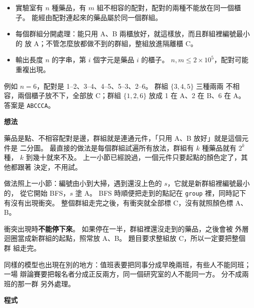 \begin{itemize}
\item 實驗室有 $n$ 種藥品，有 $m$ 組不相容的配對，配對的兩種不能放在同一個櫃
子。 能經由配對連起來的藥品屬於同一個群組。
\item 每個群組分開處理：能只用 A、B 兩櫃放好，就這樣放，而且群組裡編號最小的
放 A；不管怎麼放都做不到的群組，整組放進隔離櫃 C。
\item 輸出長度 $n$ 的字串，第 $i$ 個字元是藥品 $i$ 的櫃子。 $n, m \le 2 \times
10^5$，配對可能重複出現。
\end{itemize}

例如 $n = 6$，配對是 1--2、3--4、4--5、5--3、2--6。 群組 $\{3, 4, 5\}$ 三種兩兩
不相容，兩個櫃子放不下，全部放 C；群組 $\{1, 2, 6\}$ 放成 1 在 A、2 在 B、6 在 A。
答案是 \texttt{ABCCCA}。

\textbf{想法}

藥品是點、不相容配對是邊，群組就是連通元件，「只用 A、B 放好」就是這個元件是
二分圖。 最直接的做法是每個群組試遍所有放法，群組有 $k$ 種藥品就有 $2^k$ 種，
$k$ 到幾十就來不及。 上一小節已經說過，一個元件只要起點的顏色定了，其他都跟著
決定，不用試。

做法照上一小節：編號由小到大掃，遇到還沒上色的 $s$，它就是新群組裡編號最小的，
從它開始 BFS，$s$ 塗 A。 BFS 時順便把走到的點記在 \texttt{group} 裡，同時記下
有沒有出現衝突。 整個群組走完之後，有衝突就全部標 C，沒有就照顏色標 A、B。

衝突出現時\textbf{不能停下來}。 如果停在一半，群組裡還沒走到的藥品，之後會被
外層迴圈當成新群組的起點，照常放 A、B。 題目要求整組放 C，所以一定要把整個群
組走完。

同樣的模型也出現在別的地方：值班表要把同事分成早晚兩班，有些人不能同班；一場
辯論賽要把報名者分成正反兩方，同一個研究室的人不能同一方。 分不成兩班的那一群
另外處理。

\textbf{程式}

